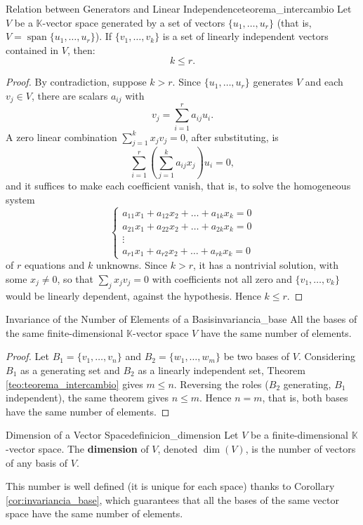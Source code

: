 \documentclass[11pt, a4paper]{article}
\begin{document}
\begin{teorema}{Relation between Generators and Linear Independence}{teorema_intercambio}
Let $V$ be a $\mathbb{K}$-vector space generated by a set of vectors $\{u_1, \dots, u_r\}$ (that is, $V = \operatorname{span}\{u_1, \dots, u_r\}$).
If $\{v_1, \dots, v_k\}$ is a set of linearly independent vectors contained in $V$, then:
\[
k \le r.
\]
\end{teorema}

\begin{proof}
By contradiction, suppose $k > r$. Since $\{u_1, \dots, u_r\}$ generates $V$ and each $v_j \in V$, there are scalars $a_{ij}$ with
\[
v_j = \sum_{i=1}^{r} a_{ij} u_i.
\]
A zero linear combination $\sum_{j=1}^{k} x_j v_j = 0$, after substituting, is
\[
\sum_{i=1}^{r} \left( \sum_{j=1}^{k} a_{ij} x_j \right) u_i = 0,
\]
and it suffices to make each coefficient vanish, that is, to solve the homogeneous system
\[
\begin{cases}
a_{11}x_1 + a_{12}x_2 + \dots + a_{1k}x_k = 0 \\
a_{21}x_1 + a_{22}x_2 + \dots + a_{2k}x_k = 0 \\
\vdots \\
a_{r1}x_1 + a_{r2}x_2 + \dots + a_{rk}x_k = 0
\end{cases}
\]
of $r$ equations and $k$ unknowns. Since $k > r$, it has a nontrivial solution, with some $x_j \neq 0$, so that $\sum_{j} x_j v_j = 0$ with coefficients not all zero and $\{v_1, \dots, v_k\}$ would be linearly dependent, against the hypothesis. Hence $k \le r$.
\end{proof}

\begin{corolario}{Invariance of the Number of Elements of a Basis}{invariancia_base}
All the bases of the same finite-dimensional $\mathbb{K}$-vector space $V$ have the same number of elements.
\end{corolario}

\begin{proof}
Let $B_1 = \{v_1, \dots, v_n\}$ and $B_2 = \{w_1, \dots, w_m\}$ be two bases of $V$. Considering $B_1$ as a generating set and $B_2$ as a linearly independent set, Theorem \ref{teo:teorema_intercambio} gives $m \le n$. Reversing the roles ($B_2$ generating, $B_1$ independent), the same theorem gives $n \le m$. Hence $n = m$, that is, both bases have the same number of elements.
\end{proof}

\begin{definicion}{Dimension of a Vector Space}{definicion_dimension}
Let $V$ be a finite-dimensional $\mathbb{K}$-vector space.
The \textbf{dimension} of $V$, denoted $\dim(V)$, is the number of vectors of any basis of $V$.

This number is well defined (it is unique for each space) thanks to Corollary \ref{cor:invariancia_base}, which guarantees that all the bases of the same vector space have the same number of elements.
\end{definicion}
\end{document}
